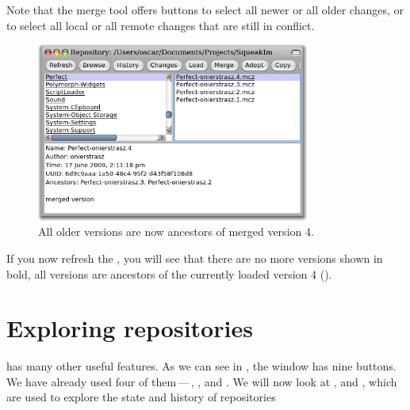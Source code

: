 \documentclass[a4paper,10pt,twoside]{book}
\begin{document}
Note that the merge tool offers buttons to select all newer or all older changes, or to select all local or all remote changes that are still in conflict.



\begin{figure}[ht]\centering
	\includegraphics[width=0.8\textwidth]{merged}
	\caption{All older versions are now ancestors of merged version 4.
	}
\end{figure}

If you now refresh the \RI, you will see that there are no more versions shown in bold, \ie all versions are ancestors of the currently loaded version 4 ().

\section{Exploring \MC repositories}

\MC has many other useful features. As we can see in , the \MCB window has nine buttons. We have already used four of them\,---\,, ,  and .
We will now look at ,  and , which are used to explore the state and history of repositories

\end{document}
